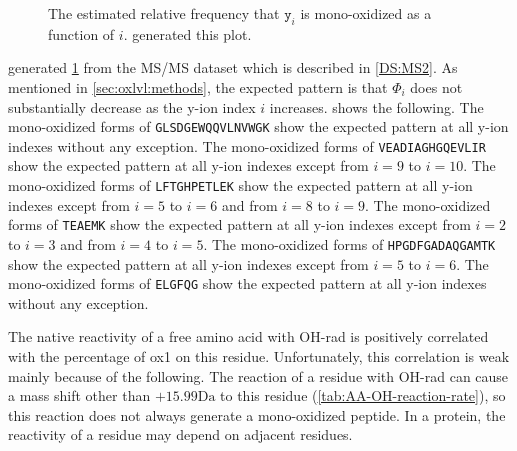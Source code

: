 \begin{figure}
\begin{center}
\end{center}
\caption[ %
	The estimated relative frequency that $\texttt{y}_i$ is \gls{mono-oxidized} as a function of $i$.]{
	The estimated relative frequency that $\texttt{y}_i$ is \gls{mono-oxidized} as a function of $i$.
	 generated this plot.
	\label{plot_yratio_vs_i}}
\end{figure}

 generated \cref{plot_yratio_vs_i} from the \gls{MS/MS} dataset which is described in \cref{DS:MS2}. 
As mentioned in \cref{sec:oxlvl:methods}, the expected pattern is that \(\Phi_i\) does not substantially decrease as the y-ion index \(i\) increases.
 shows the following.
The \gls{mono-oxidized} forms of \texttt{GLSDGEWQQVLNVWGK} show the expected pattern at all y-ion indexes without any exception. 
The \gls{mono-oxidized} forms of \texttt{VEADIAGHGQEVLIR}  show the expected pattern at all y-ion indexes except from \(i=9\) to \(i=10\).
The \gls{mono-oxidized} forms of \texttt{LFTGHPETLEK}      show the expected pattern at all y-ion indexes except from \(i=5\) to \(i=6\) and from \(i=8\) to \(i=9\).
The \gls{mono-oxidized} forms of \texttt{TEAEMK}           show the expected pattern at all y-ion indexes except from \(i=2\) to \(i=3\) and from \(i=4\) to \(i=5\).
The \gls{mono-oxidized} forms of \texttt{HPGDFGADAQGAMTK}  show the expected pattern at all y-ion indexes except from \(i=5\) to \(i=6\).
The \gls{mono-oxidized} forms of \texttt{ELGFQG}           show the expected pattern at all y-ion indexes without any exception.

The native reactivity of a free amino acid with \gls{OH-rad} is positively correlated with the percentage of \gls{ox1} on this residue. 
Unfortunately, this correlation is weak mainly because of the following.
The reaction of a residue with \gls{OH-rad} can cause a mass shift other than \(+15.99\si{\dalton}\) to this residue (\cref{tab:AA-OH-reaction-rate}),
	so this reaction does not always generate a \gls{mono-oxidized} peptide.
In a protein, the reactivity of a residue may depend on adjacent residues.
	
